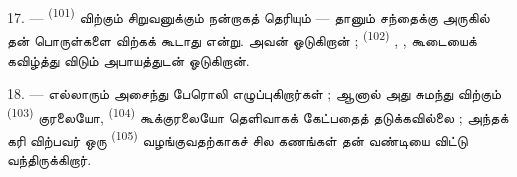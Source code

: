 17. ---  \textsuperscript{(101)} 
விற்கும் சிறுவனுக்கும் நன்றாகத் தெரியும் — தானும் சந்தைக்கு
அருகில் தன் பொருள்களை விற்கக் கூடாது என்று. அவன் ஓடுகிறான் ;
 
\textsuperscript{(102)} , ,
 கூடையைக் கவிழ்த்து விடும் அபாயத்துடன்
ஓடுகிறான்.

18. --- எல்லாரும் அசைந்து பேரொலி எழுப்புகிறார்கள் ; ஆனால் அது
சுமந்து விற்கும் 
\textsuperscript{(103)} குரலையோ, 
\textsuperscript{(104)} கூக்குரலையோ தெளிவாகக் கேட்பதைத்
தடுக்கவில்லை ; அந்தக் கரி விற்பவர் ஒரு 
\textsuperscript{(105)} வழங்குவதற்காகச் சில கணங்கள் தன்
வண்டியை விட்டு வந்திருக்கிறார்.

\VUsaut{6.0mm}
\VUfilet{22mm}
